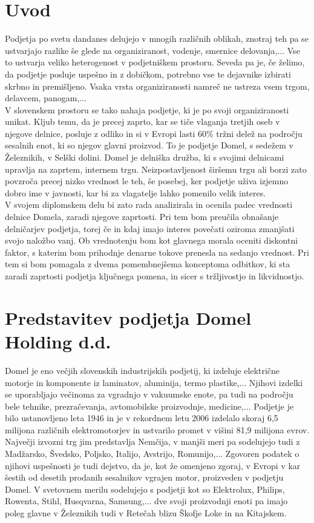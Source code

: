 \documentclass[12pt,a4paper]{amsart}
\theoremstyle{definition} %
\theoremstyle{plain} %
\begin{document}
\section{Uvod}
Podjetja po svetu dandanes delujejo v mnogih različnih oblikah, znotraj teh pa se ustvarjajo razlike še glede na organiziranost, vodenje, smernice delovanja,... Vse to ustvarja veliko heterogenost v podjetniškem prostoru. Seveda pa je, če želimo, da podjetje posluje uspešno in z dobičkom, potrebno vse te dejavnike izbirati skrbno in premišljeno. Vsaka vrsta organiziranosti namreč ne ustreza vsem trgom, delavcem, panogam,... \\
V slovenskem prostoru se tako nahaja podjetje, ki je po svoji organiziranosti unikat. Kljub temu, da je precej zaprto, kar se tiče vlaganja tretjih oseb v njegove delnice, posluje z odliko in si v Evropi lasti 60\% tržni delež na področju sesalnih enot, ki so njegov glavni proizvod. To je podjetje Domel, s sedežem v Železnikih, v Selški dolini. Domel je delniška družba, ki s svojimi delnicami upravlja na zaprtem, internem trgu. Neizpostavljenost širšemu trgu ali borzi zato povzroča precej nizko vrednost le teh, še posebej, ker podjetje uživa izjemno dobro ime v javnosti, kar bi za vlagatelje lahko pomenilo velik interes.\\
V svojem diplomskem delu bi zato rada analizirala in ocenila padec vrednosti delnice Domela, zaradi njegove zaprtosti. Pri tem bom preučila obnašanje delničarjev podjetja, torej če in kdaj imajo interes povečati oziroma zmanjšati svojo naložbo vanj. Ob vrednotenju bom kot glavnega morala oceniti diskontni faktor, s katerim bom prihodnje denarne tokove prenesla na sedanjo vrednost. Pri tem si bom pomagala z dvema pomembnejšema konceptoma odbitkov, ki sta zaradi zaprtosti podjetja ključnega pomena, in sicer s tržljivostjo in likvidnostjo.
\newpage

\section{Predstavitev podjetja Domel Holding d.d.}
Domel je eno večjih slovenskih industrijskih podjetij, ki izdeluje električne motorje in komponente iz laminatov, aluminija, termo plastike,... Njihovi izdelki se uporabljajo večinoma za vgradnjo v vakuumske enote, pa tudi na področju bele tehnike, prezračevanja, avtomobilske proizvodnje, medicine,...
Podjetje je bilo ustanovljeno leta 1946 in je v rekordnem letu 2006 izdelalo skoraj 6,5 milijona različnih elektromotorjev in ustvarilo promet v višini 81,9 milijona evrov. Največji izvozni trg jim predstavlja Nemčija, v manjši meri pa sodelujejo tudi z Madžarsko, Švedsko, Poljsko, Italijo, Avstrijo, Romunijo,... Zgovoren podatek o njihovi uspešnosti je tudi dejstvo, da je, kot že omenjeno zgoraj, v Evropi v kar šestih od desetih prodanih sesalnikov vgrajen motor, proizveden v podjetju Domel. V svetovnem merilu sodelujejo s podjetji kot so Elektrolux, Philips, Rowenta, Stihl, Husqvarna, Samsung,... dve svoji proizvodnji enoti pa imajo poleg glavne v Železnikih tudi v Retečah blizu Škofje Loke in na Kitajskem.
\end{document}
